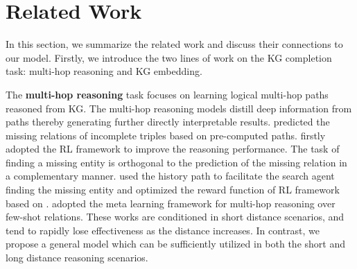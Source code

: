 \section{Related Work}
\label{sec:related work}



In this section, we summarize the related work and discuss their connections to our model.
Firstly, we introduce the two lines of work on the KG completion task: multi-hop reasoning and KG embedding.


The \textbf{multi-hop reasoning} task focuses on learning logical multi-hop paths reasoned from KG.
The multi-hop reasoning models distill deep information from paths thereby generating further directly interpretable results.
\cite{lao2011random,das2016chains,jiang2017attentive,yin2018recurrent}
predicted the missing relations of incomplete triples based on pre-computed paths. 
\cite{Xiong2018DeepPath} firstly adopted the RL framework to improve the reasoning performance. 
The task of finding a missing entity is orthogonal to the prediction of the missing relation in a complementary manner.
\cite{das2017go} used the history path to facilitate the search agent finding the missing entity
and \cite{LinEMNLP2018} optimized the reward function of RL framework based on \cite{das2017go}.
\cite{lv-etal-2019-adapting} adopted the meta learning framework for multi-hop reasoning over few-shot relations.
These works are conditioned in short distance scenarios, and tend to rapidly lose effectiveness as the distance increases. In contrast, we propose a general model which can be sufficiently utilized in both the short and long distance reasoning scenarios.



